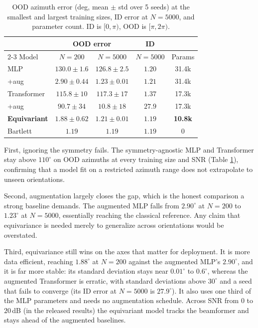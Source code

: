 \documentclass[conference]{IEEEtran}
\begin{document}
\begin{table}[t]
\caption{OOD azimuth error (deg, mean $\pm$ std over 5 seeds) at the smallest and
largest training sizes, ID error at $N{=}5000$, and parameter count. ID is
$[0,\pi)$, OOD is $[\pi,2\pi)$.}
\label{tab:main}
\centering
\footnotesize
\setlength{\tabcolsep}{4pt}
\begin{tabular}{@{}lcccc@{}}
\toprule
 & \multicolumn{2}{c}{OOD error} & ID & \\
\cmidrule(lr){2-3}
Model & $N{=}200$ & $N{=}5000$ & $N{=}5000$ & Params \\
\midrule
MLP             & $130.0\!\pm\!1.6$ & $126.8\!\pm\!2.5$ & $1.20$ & 31.4k \\
\;+aug          & $2.90\!\pm\!0.44$ & $1.23\!\pm\!0.01$ & $1.21$ & 31.4k \\
Transformer     & $115.8\!\pm\!10$  & $117.3\!\pm\!17$  & $1.37$ & 17.3k \\
\;+aug          & $90.7\!\pm\!34$   & $10.8\!\pm\!18$   & $27.9$ & 17.3k \\
\textbf{Equivariant} & $\mathbf{1.88\!\pm\!0.62}$ & $\mathbf{1.21\!\pm\!0.01}$ & $\mathbf{1.19}$ & \textbf{10.8k} \\
\midrule
Bartlett        & $1.19$ & $1.19$ & $1.19$ & 0 \\
\bottomrule
\end{tabular}
\end{table}

First, ignoring the symmetry fails. The symmetry-agnostic MLP and Transformer stay
above $110^\circ$ on OOD azimuths at every training size and SNR (Table
\ref{tab:main}), confirming that a model fit on a restricted azimuth range does not
extrapolate to unseen orientations.

Second, augmentation largely closes the gap, which is the honest comparison a
strong baseline demands. The augmented MLP falls from $2.90^\circ$ at $N{=}200$ to
$1.23^\circ$ at $N{=}5000$, essentially reaching the classical reference. Any claim
that equivariance is needed merely to generalize across orientations would be
overstated.

Third, equivariance still wins on the axes that matter for deployment. It is more
data efficient, reaching $1.88^\circ$ at $N{=}200$ against the augmented MLP's
$2.90^\circ$, and it is far more stable: its standard deviation stays near
$0.01^\circ$ to $0.6^\circ$, whereas the augmented Transformer is erratic, with
standard deviations above $30^\circ$ and a seed that fails to converge (its ID error
at $N{=}5000$ is $27.9^\circ$). It also uses one third of the MLP parameters and
needs no augmentation schedule. Across SNR from $0$ to $20$\,dB (in the released
results) the equivariant model tracks the beamformer and stays ahead of the
augmented baselines.
\end{document}
